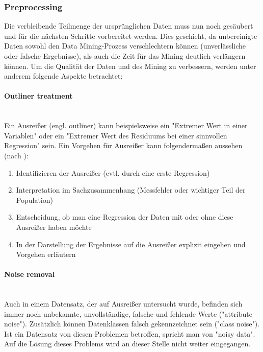 \subsubsection{Preprocessing}
Die verbleibende Teilmenge der ursprünglichen Daten muss nun noch gesäubert und für die nächsten Schritte vorbereitet werden. Dies geschieht, da unbereinigte Daten sowohl den Data Mining-Prozess verschlechtern können (unverlässliche oder falsche Ergebnisse), als auch die Zeit für das Mining deutlich verlängern können.\citep[S.~70]{swamynathan_mastering_2017}
Um die Qualität der Daten und des Mining zu verbessern, werden unter anderem folgende Aspekte betrachtet:
\paragraph{Outliner treatment}\mbox{} \\
Ein Ausreißer (engl. outliner) kann beispielsweise ein "Extremer Wert in einer Variablen" oder ein "Extremer Wert des Residuums bei einer sinnvollen Regression"\citep[S.~25; Teil 5b]{hertle_datenanalyse_2016} sein. Ein Vorgehen für Ausreißer kann folgendermaßen aussehen (nach \citep[S.~25; Teil 5b]{hertle_datenanalyse_2016}):
\begin{enumerate}
\item Identifizieren der Ausreißer (evtl. durch eine erste Regression)
\item Interpretation im Sachzusammenhang (Messfehler oder wichtiger Teil der Population)
\item Entscheidung, ob man eine Regression der Daten mit oder ohne diese Ausreißer haben möchte
\item In der Darstellung der Ergebnisse auf die Ausreißer explizit eingehen und Vorgehen erläutern
\end{enumerate}

\paragraph{Noise removal}\mbox{} \\
Auch in einem Datensatz, der auf Ausreißer untersucht wurde, befinden sich immer noch unbekannte, unvollständige, falsche und fehlende Werte ("attribute noise"). Zusätzlich können Datenklassen falsch gekennzeichnet sein ("class noise"). Ist ein Datensatz von diesen Problemen betroffen, spricht man von "noisy data". Auf die Lösung dieses Problems wird an dieser Stelle nicht weiter eingegangen. 

